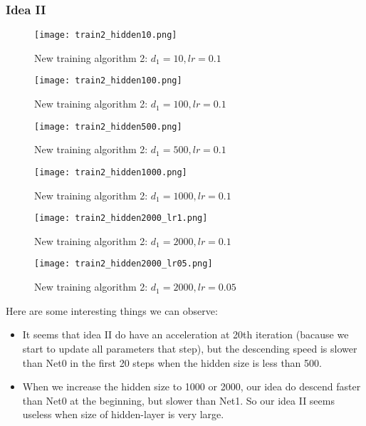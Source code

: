\subsubsection{Idea II}
\begin{figure}[H]
	\centering
	\texttt{[image: train2\_hidden10.png]}
	\caption{New training algorithm 2: $d_1 = 10, lr = 0.1$}
\end{figure}
\begin{figure}[H]
	\centering
	\texttt{[image: train2\_hidden100.png]}
	\caption{New training algorithm 2: $d_1 = 100, lr = 0.1$}
\end{figure}
\begin{figure}[H]
	\centering
	\texttt{[image: train2\_hidden500.png]}
	\caption{New training algorithm 2: $d_1 = 500, lr = 0.1$}
\end{figure}
\begin{figure}[H]
	\centering
	\texttt{[image: train2\_hidden1000.png]}
	\caption{New training algorithm 2: $d_1 = 1000, lr = 0.1$}
\end{figure}
\begin{figure}[H]
	\centering
	\texttt{[image: train2\_hidden2000\_lr1.png]}
	\caption{New training algorithm 2: $d_1 = 2000, lr = 0.1$}
\end{figure}
\begin{figure}[H]
	\centering
	\texttt{[image: train2\_hidden2000\_lr05.png]}
	\caption{New training algorithm 2: $d_1 = 2000, lr = 0.05$}
\end{figure}

Here are some interesting things we can observe:
\begin{itemize}
	\item It seems that idea II do have an acceleration at 20th iteration (bacause we start to update all parameters that step), but the descending speed is slower than Net0 in the first 20 steps when the hidden size is less than 500.
	\item When we increase the hidden size to 1000 or 2000, our idea do descend faster than Net0 at the beginning, but slower than Net1. So our idea II seems useless when size of hidden-layer is very large.

	
\end{itemize}
